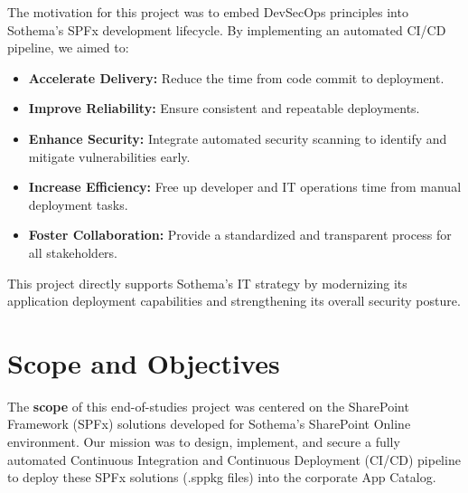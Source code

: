The motivation for this project was to embed DevSecOps principles into Sothema's SPFx development lifecycle. By implementing an automated CI/CD pipeline, we aimed to:
\begin{itemize}
    \item \textbf{Accelerate Delivery:} Reduce the time from code commit to deployment.
    \item \textbf{Improve Reliability:} Ensure consistent and repeatable deployments.
    \item \textbf{Enhance Security:} Integrate automated security scanning to identify and mitigate vulnerabilities early.
    \item \textbf{Increase Efficiency:} Free up developer and IT operations time from manual deployment tasks.
    \item \textbf{Foster Collaboration:} Provide a standardized and transparent process for all stakeholders.
\end{itemize}

This project directly supports Sothema's IT strategy by modernizing its application deployment capabilities and strengthening its overall security posture.

\section{Scope and Objectives}
\label{sec:intro_scope_objectives}

The \textbf{scope} of this end-of-studies project was centered on the SharePoint Framework (SPFx) solutions developed for Sothema's SharePoint Online environment. Our mission was to design, implement, and secure a fully automated Continuous Integration and Continuous Deployment (CI/CD) pipeline to deploy these SPFx solutions (.sppkg files) into the corporate App Catalog.

